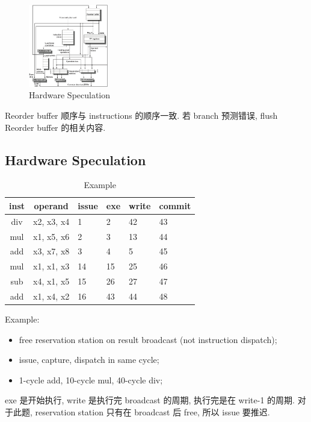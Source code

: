 \begin{figure}[!htb]
    \centering
    \includegraphics[width=0.309\textwidth]{pic/CA3/Hardware Speculation}
    \caption{Hardware Speculation}
\end{figure}

Reorder buffer 顺序与 instructions 的顺序一致. 若 branch 预测错误, flush Reorder buffer 的相关内容. 

\subsection{Hardware Speculation}

\begin{table}[!htb]
    \centering
    \caption{Example}
    \begin{tabular}[c]{ccllll}\toprule
        inst & operand & issue & exe & write & commit \\ \midrule
        div & x2, x3, x4 &  1 &  2 & 42 & 43 \\
        mul & x1, x5, x6 &  2 &  3 & 13 & 44 \\
        add & x3, x7, x8 &  3 &  4 &  5 & 45 \\
        mul & x1, x1, x3 & 14 & 15 & 25 & 46 \\
        sub & x4, x1, x5 & 15 & 26 & 27 & 47 \\
        add & x1, x4, x2 & 16 & 43 & 44 & 48 \\
        \bottomrule
    \end{tabular}
\end{table}

Example: 
\begin{itemize}\scriptsize
    \item free reservation station on result broadcast (not instruction dispatch); 
    \item issue, capture, dispatch in same cycle; 
    \item 1-cycle add, 10-cycle mul, 40-cycle div;
\end{itemize}

exe 是开始执行, write 是执行完 broadcast 的周期, 执行完是在 write-1 的周期. 对于此题, reservation station 只有在 broadcast 后 free, 所以 issue 要推迟. 


